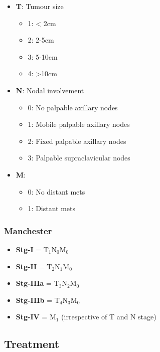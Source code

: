 \documentclass[
  14pt,
]{extarticle}
\providecommand{\tightlist}{%
  \setlength{\itemsep}{0pt}\setlength{\parskip}{0pt}}
\begin{document}
\begin{itemize}
\tightlist
\item
  \textbf{T}: Tumour size

  \begin{itemize}
  \tightlist
  \item
    1: \textless{} 2cm
  \item
    2: 2-5cm
  \item
    3: 5-10cm
  \item
    4: \textgreater10cm
  \end{itemize}
\item
  \textbf{N}: Nodal involvement

  \begin{itemize}
  \tightlist
  \item
    0: No palpable axillary nodes
  \item
    1: Mobile palpable axillary nodes
  \item
    2: Fixed palpable axillary nodes
  \item
    3: Palpable supraclavicular nodes
  \end{itemize}
\item
  \textbf{M}:

  \begin{itemize}
  \tightlist
  \item
    0: No distant mets
  \item
    1: Distant mets
  \end{itemize}
\end{itemize}

\hypertarget{manchester}{%
\subsubsection{Manchester}\label{manchester}}

\begin{itemize}
\tightlist
\item
  \textbf{Stg-I} = T\(_1\)N\(_0\)M\(_0\)
\item
  \textbf{Stg-II} = T\(_2\)N\(_1\)M\(_0\)
\item
  \textbf{Stg-IIIa} = T\(_3\)N\(_2\)M\(_0\)
\item
  \textbf{Stg-IIIb} = T\(_4\)N\(_3\)M\(_0\)
\item
  \textbf{Stg-IV} = M\(_1\) (irrespective of T and N stage)
\end{itemize}

\hypertarget{treatment-2}{%
\subsection{Treatment}\label{treatment-2}}
\end{document}
